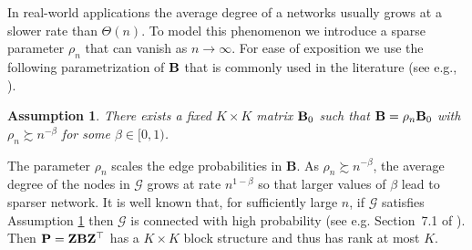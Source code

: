 \documentclass[10pt,journal,compsoc]{IEEEtran}
\newtheorem{A}{Assumption}
\newcommand{\M}[1]{{{\mathbf{\MakeUppercase{#1}}}}}
\numberwithin{equation}{section}
\begin{document}
{\color{black}In real-world applications the average degree of a networks usually grows at a slower rate than $\Theta(n)$. To model this phenomenon we introduce a sparse parameter $\rho_n$ that can vanish as $n\rightarrow \infty$. For ease of exposition we use the following parametrization of $\M B$ that is commonly used in the literature (see  e.g., \cite{bickel2009nonparametric}). %
\begin{A}
  \label{am:s} There exists a fixed $K \times K$ matrix $\M B_0$ such that $\M B = \rho_n\M B_0$ with $\rho_n\succsim n^{-\beta}$ for some $\beta \in [0,1)$.
\end{A}
The parameter $\rho_n$ scales the edge probabilities in $\mathbf{B}$. As $\rho_n \succsim n^{-\beta}$, the average degree of the nodes in $\mathcal{G}$ grows at rate $n^{1 - \beta}$ so that larger values of $\beta$ lead to sparser network. 
It is well known that, for sufficiently large $n$, if $\mathcal{G}$ satisfies Assumption \ref{am:s} then $\mathcal{G}$ is connected
with high probability (see e.g. Section~7.1 of \cite{bollobas2001random}). Then $\M  P = \M Z \mathbf{B} \M Z^{\top}$ has a $K \times K$ block structure and thus has rank at most $K$. 
}
\end{document}
